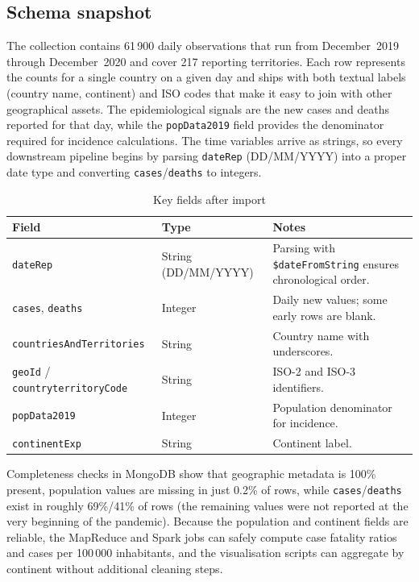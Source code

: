 \documentclass[12pt,a4paper]{article}
\begin{document}
\subsection{Schema snapshot}
The collection contains 61\,900 daily observations that run from December~2019 through December~2020 and cover 217 reporting territories. Each row represents the counts for a single country on a given day and ships with both textual labels (country name, continent) and ISO codes that make it easy to join with other geographical assets. The epidemiological signals are the new cases and deaths reported for that day, while the \texttt{popData2019} field provides the denominator required for incidence calculations. The time variables arrive as strings, so every downstream pipeline begins by parsing \texttt{dateRep} (DD/MM/YYYY) into a proper date type and converting \texttt{cases}/\texttt{deaths} to integers.

\begin{table}[H]
    \centering
    \caption{Key fields after import}
    \begin{tabular}{@{}p{5cm}p{2.5cm}p{5.5cm}@{}}
        \toprule
        Field & Type & Notes \\
        \midrule
        \texttt{dateRep} & String (DD/MM/YYYY) & Parsing with \texttt{\$dateFromString} ensures chronological order. \\
        \texttt{cases}, \texttt{deaths} & Integer & Daily new values; some early rows are blank. \\
        \texttt{countriesAndTerritories} & String & Country name with underscores. \\
        \texttt{geoId} / \texttt{countryterritoryCode} & String & ISO-2 and ISO-3 identifiers. \\
        \texttt{popData2019} & Integer & Population denominator for incidence. \\
        \texttt{continentExp} & String & Continent label. \\
        \bottomrule
    \end{tabular}
\end{table}
\FloatBarrier

Completeness checks in MongoDB show that geographic metadata is 100\% present, population values are missing in just 0.2\% of rows, while \texttt{cases}/\texttt{deaths} exist in roughly 69\%/41\% of rows (the remaining values were not reported at the very beginning of the pandemic). Because the population and continent fields are reliable, the MapReduce and Spark jobs can safely compute case fatality ratios and cases per 100\,000 inhabitants, and the visualisation scripts can aggregate by continent without additional cleaning steps.
\end{document}
